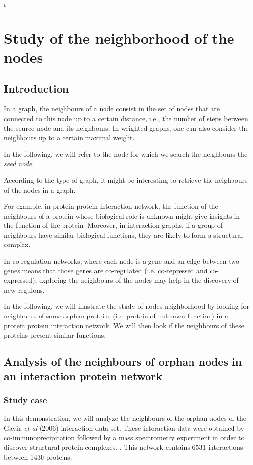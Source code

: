 r\chapter{Study of the neighborhood of the nodes}

\section{Introduction}
In a graph, the neighbours of a node consist in the set of nodes that are connected
to this node up to a certain distance, i.e., the number of steps
between the source node and its neighbours. In weighted graphs, one can also consider the neighbours up to 
a certain maximal weight.

In the following, we will refer to the node for which we search the neighbours the \textit{seed node}.

According to the type of graph, it might be 
interesting to retrieve the neighbours of the nodes in a graph.

For example, in protein-protein interaction network, the function of the neighbours of a protein whose
biological role is unknown might give insights in the function of the protein.
Moreover, in interaction graphs, if a group of neighbours have similar biological functions, they are likely to
form a structural complex.

In co-regulation networks, where each node is a gene and an edge between two genes means that those genes are
co-regulated (i.e. co-repressed and co-expressed), exploring the neighbours of the nodes may help in the discovery of 
new regulons.

In the following, we will illustrate the study of nodes neighborhood by looking for neighbours of some orphan proteins (i.e. protein of unknown function)  in a protein protein interaction network. We will then look if the neighbours of these proteins present similar functions.

\section{Analysis of the neighbours of orphan nodes in an interaction protein network}
\subsection{Study case}

In this demonstration, we will analyze the neighbours of the orphan nodes of the 
Gavin \textit{et al} (2006) interaction data set. These interaction data were obtained
by co-immunoprecipitation followed by a mass spectrometry experiment in order to
discover structural protein complexes. \cite{Gavin2006}. 
This network contains 6531 interactions between 1430
proteins.

